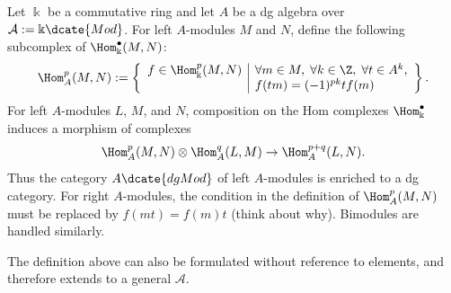 \begin{example}\label{eg:dg-Hom-cplx}
	Let $\Bbbk$ be a commutative ring and let $A$ be a dg algebra over
	$\mathcal{A}:=\Bbbk\dcate{Mod}$. For left $A$-modules $M$ and $N$, define
	the following subcomplex of $\Hom^\bullet_{\Bbbk}(M,N)$:
	\[ \Hom^p_A(M, N) := \left\{\begin{array}{r|l}
		f \in \Hom^p_{\Bbbk}(M, N) & \forall m \in M, \; \forall k \in \Z, \; \forall t \in A^k, \\
		& f(tm) = (-1)^{pk} tf(m)
	\end{array}\right\}. \]
	For left $A$-modules $L$, $M$, and $N$, composition on the Hom complexes
	$\Hom^\bullet_{\Bbbk}$ induces a morphism of complexes
	\[ \Hom^p_A(M, N) \otimes \Hom^q_A(L, M) \to \Hom^{p+q}_A(L, N). \]
	Thus the category $A\dcate{dgMod}$ of left $A$-modules is enriched to a dg
	category. For right $A$-modules, the condition in the definition of
	$\Hom^p_A(M,N)$ must be replaced by $f(mt)=f(m)t$ (think about why).
	Bimodules are handled similarly.

	The definition above can also be formulated without reference to elements,
	and therefore extends to a general $\mathcal{A}$.
\end{example}

